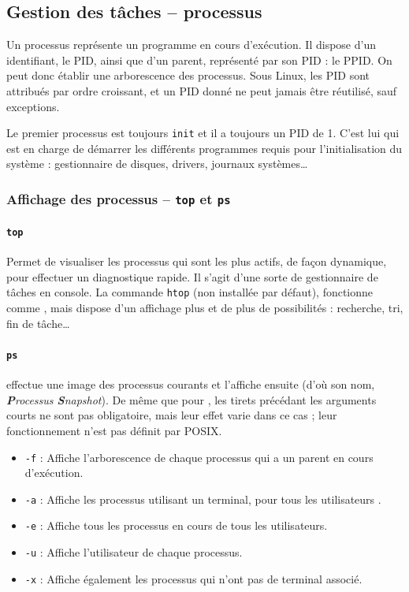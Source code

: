 \newpage

\subsection{Gestion des tâches -- processus}

Un processus représente un programme en cours d'exécution. Il dispose d'un identifiant, le PID, ainsi que d'un parent, représenté par son PID : le PPID. On peut donc établir une arborescence des processus.
Sous Linux, les PID sont attribués par ordre croissant, et un PID donné ne peut jamais être réutilisé, sauf exceptions.

Le premier processus est toujours \texttt{init} et il a toujours un PID de 1. C'est lui qui est en charge de démarrer les différents programmes requis pour l'initialisation du système : gestionnaire de disques, drivers, journaux systèmes\dots

\subsubsection{Affichage des processus -- \texttt{top} et \texttt{ps}}

\paragraph{\texttt{top}} 
Permet de visualiser les processus qui sont les plus actifs, de façon dynamique, pour effectuer un diagnostique rapide. Il s'agit d'une sorte de gestionnaire de tâches en console.\newline
{} La commande \texttt{htop} (non installée par défaut), fonctionne comme , mais dispose d'un affichage plus et de plus de possibilités : recherche, tri, fin de tâche\dots

\paragraph{\texttt{ps}} 
 effectue une image des processus courants et l'affiche ensuite (d'où son nom, \textit{\textbf{P}rocessus \textbf{S}napshot}). De même que pour , les tirets précédant les arguments courts ne sont pas obligatoire, mais leur effet varie dans ce cas ; leur fonctionnement n'est pas définit par POSIX.
\begin{itemize}
    \item \texttt{-f} : Affiche l'arborescence de chaque processus qui a un parent en cours d'exécution.
    \item \texttt{-a} : Affiche les processus utilisant un terminal, pour tous les utilisateurs .
    \item \texttt{-e} : Affiche tous les processus en cours de tous les utilisateurs.
    \item \texttt{-u} : Affiche l'utilisateur de chaque processus.
    \item \texttt{-x} : Affiche également les processus qui n'ont pas de terminal associé.
\end{itemize}

